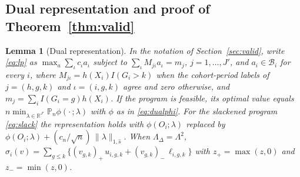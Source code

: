 \documentclass[12pt]{article}
\newtheorem{lemma}{Lemma}
\theoremstyle{remark}
\begin{document}
\subsection{Dual representation and proof of Theorem~\ref{thm:valid}}

\begin{lemma}[Dual representation]
\label{lem:dual}
In the notation of Section~\ref{sec:valid}, write \eqref{eq:lp} as
$\max_a \sum_\iota c_\iota a_\iota$ subject to $\sum_\iota M_{j\iota} a_\iota = m_j$,
$j = 1, \ldots, J'$, and $a_i \in \mathcal{B}_i$ for every $i$, where
$M_{j\iota} = h(X_i)I(G_i > k)$ when the cohort-period labels of $j = (h,g,k)$ and
$\iota = (i,g,k)$ agree and zero otherwise, and $m_j = \sum_i I(G_i{=}g)h(X_i)$. If the
program is feasible, its optimal value equals
$n \min_{\lambda \in \mathbb{R}^{J'}} \mathbb{P}_n \phi(\cdot\,;\lambda)$ with $\phi$ as
in \eqref{eq:dualphi}. For the slackened program \eqref{eq:slack} the
representation holds with $\phi(O_i;\lambda)$ replaced by
$\phi(O_i;\lambda) + (c_n/\sqrt{n})\,\|\lambda\|_{1,\widehat s}$. When $\Lambda_\Delta = \Lambda^2$,
$\sigma_i(v) = \sum_{g \le k} \{ (v_{g,k})_+\, u_{i,g,k} + (v_{g,k})_-\, \ell_{i,g,k} \}$
with $z_+ = \max(z,0)$ and $z_- = \min(z,0)$.
\end{lemma}
\end{document}
